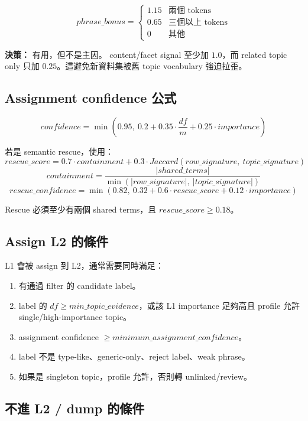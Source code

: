 \documentclass[11pt]{article}
\newcommand{\code}[1]{\texttt{\detokenize{#1}}}
\newcommand{\decision}[1]{\textbf{決策：}#1}
\begin{document}
\[
phrase\_bonus =
\begin{cases}
1.15 & \text{兩個 tokens}\\
0.65 & \text{三個以上 tokens}\\
0 & \text{其他}
\end{cases}
\]

\decision{\code{related_topics} 有用，但不是主因。} content/facet signal 至少加 \(1.0\)，而 related topic only 只加 \(0.25\)。這避免新資料集被舊 topic vocabulary 強迫拉歪。

\subsection{Assignment confidence 公式}

\[
confidence = \min\left(0.95,\ 0.2 + 0.35\cdot\frac{df}{m} + 0.25\cdot importance\right)
\]

若是 semantic rescue，使用：
\[
rescue\_score = 0.7 \cdot containment + 0.3 \cdot Jaccard(row\_signature,\ topic\_signature)
\]
\[
containment = \frac{|shared\_terms|}{\min(|row\_signature|,\ |topic\_signature|)}
\]
\[
rescue\_confidence = \min(0.82,\ 0.32 + 0.6\cdot rescue\_score + 0.12\cdot importance)
\]

Rescue 必須至少有兩個 shared terms，且 \(rescue\_score \geq 0.18\)。

\subsection{Assign L2 的條件}

L1 會被 assign 到 L2，通常需要同時滿足：
\begin{enumerate}
  \item 有通過 filter 的 candidate label。
  \item label 的 \(df \geq min\_topic\_evidence\)，或該 L1 importance 足夠高且 profile 允許 single/high-importance topic。
  \item assignment confidence \(\geq minimum\_assignment\_confidence\)。
  \item label 不是 type-like、generic-only、reject label、weak phrase。
  \item 如果是 singleton topic，profile 允許，否則轉 unlinked/review。
\end{enumerate}

\subsection{不進 L2 / dump 的條件}
\end{document}
